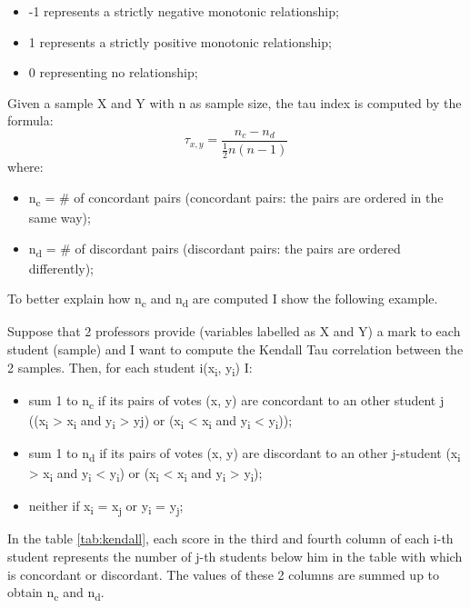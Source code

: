 \begin{itemize}
\item -1 represents a strictly negative monotonic relationship;
\item 1 represents a strictly positive monotonic relationship;
\item 0 representing no relationship;
\end{itemize}
Given a sample X and Y with n as sample size, the tau index is computed by the formula:
\begin{equation}
  \tau_{x,y} = \frac{n_c-n_d}{\frac{1}{2}n(n-1)}
\end{equation}
where:
\begin{itemize}
\item n\textsubscript{c} = \# of concordant pairs (concordant pairs: the pairs are ordered in the same way);
\item n\textsubscript{d} = \# of discordant pairs (discordant pairs: the pairs are ordered differently);
\end{itemize}
To better explain how n\textsubscript{c} and n\textsubscript{d} are computed I show the following example. \par
Suppose that 2 professors provide (variables labelled as X and Y) a mark to each student (sample) and I want to compute the Kendall Tau correlation between the 2 samples. 
Then, for each student i(x\textsubscript{i}, y\textsubscript{i}) I:
\begin{itemize}
    \item sum 1 to n\textsubscript{c} if its pairs of votes (x, y) are concordant to an other student j ((x\textsubscript{i} > x\textsubscript{i} and y\textsubscript{i} > yj) or (x\textsubscript{i} < x\textsubscript{i} and y\textsubscript{i} < y\textsubscript{i}));
    \item sum 1 to n\textsubscript{d} if its pairs of votes (x, y) are discordant to an other j-student (x\textsubscript{i} > x\textsubscript{i} and y\textsubscript{i} < y\textsubscript{i}) or (x\textsubscript{i} < x\textsubscript{i} and y\textsubscript{i} > y\textsubscript{i});
    \item neither if x\textsubscript{i} = x\textsubscript{j} or y\textsubscript{i} = y\textsubscript{j};
\end{itemize} 
In the table \ref{tab:kendall}, each score in the third and fourth column of each i-th student represents the number of j-th students below him in the table with which is concordant or discordant.
The values of these 2 columns are summed up to obtain n\textsubscript{c} and n\textsubscript{d}.
